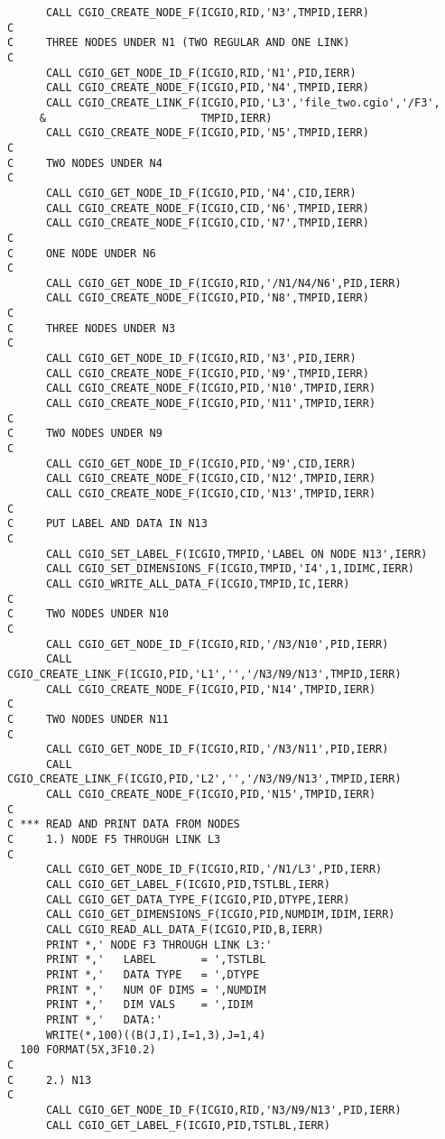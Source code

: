 \begin{verbatim}
      CALL CGIO_CREATE_NODE_F(ICGIO,RID,'N3',TMPID,IERR)
C
C     THREE NODES UNDER N1 (TWO REGULAR AND ONE LINK)
C
      CALL CGIO_GET_NODE_ID_F(ICGIO,RID,'N1',PID,IERR)
      CALL CGIO_CREATE_NODE_F(ICGIO,PID,'N4',TMPID,IERR)
      CALL CGIO_CREATE_LINK_F(ICGIO,PID,'L3','file_two.cgio','/F3',
     &                        TMPID,IERR)
      CALL CGIO_CREATE_NODE_F(ICGIO,PID,'N5',TMPID,IERR)
C
C     TWO NODES UNDER N4
C
      CALL CGIO_GET_NODE_ID_F(ICGIO,PID,'N4',CID,IERR)
      CALL CGIO_CREATE_NODE_F(ICGIO,CID,'N6',TMPID,IERR)
      CALL CGIO_CREATE_NODE_F(ICGIO,CID,'N7',TMPID,IERR)
C
C     ONE NODE UNDER N6
C
      CALL CGIO_GET_NODE_ID_F(ICGIO,RID,'/N1/N4/N6',PID,IERR)
      CALL CGIO_CREATE_NODE_F(ICGIO,PID,'N8',TMPID,IERR)
C
C     THREE NODES UNDER N3
C
      CALL CGIO_GET_NODE_ID_F(ICGIO,RID,'N3',PID,IERR)
      CALL CGIO_CREATE_NODE_F(ICGIO,PID,'N9',TMPID,IERR)
      CALL CGIO_CREATE_NODE_F(ICGIO,PID,'N10',TMPID,IERR)
      CALL CGIO_CREATE_NODE_F(ICGIO,PID,'N11',TMPID,IERR)
C
C     TWO NODES UNDER N9
C
      CALL CGIO_GET_NODE_ID_F(ICGIO,PID,'N9',CID,IERR)
      CALL CGIO_CREATE_NODE_F(ICGIO,CID,'N12',TMPID,IERR)
      CALL CGIO_CREATE_NODE_F(ICGIO,CID,'N13',TMPID,IERR)
C
C     PUT LABEL AND DATA IN N13
C
      CALL CGIO_SET_LABEL_F(ICGIO,TMPID,'LABEL ON NODE N13',IERR)
      CALL CGIO_SET_DIMENSIONS_F(ICGIO,TMPID,'I4',1,IDIMC,IERR)
      CALL CGIO_WRITE_ALL_DATA_F(ICGIO,TMPID,IC,IERR)
C
C     TWO NODES UNDER N10
C
      CALL CGIO_GET_NODE_ID_F(ICGIO,RID,'/N3/N10',PID,IERR)
      CALL CGIO_CREATE_LINK_F(ICGIO,PID,'L1','','/N3/N9/N13',TMPID,IERR)
      CALL CGIO_CREATE_NODE_F(ICGIO,PID,'N14',TMPID,IERR)
C
C     TWO NODES UNDER N11
C
      CALL CGIO_GET_NODE_ID_F(ICGIO,RID,'/N3/N11',PID,IERR)
      CALL CGIO_CREATE_LINK_F(ICGIO,PID,'L2','','/N3/N9/N13',TMPID,IERR)
      CALL CGIO_CREATE_NODE_F(ICGIO,PID,'N15',TMPID,IERR)
C
C *** READ AND PRINT DATA FROM NODES
C     1.) NODE F5 THROUGH LINK L3
C
      CALL CGIO_GET_NODE_ID_F(ICGIO,RID,'/N1/L3',PID,IERR)
      CALL CGIO_GET_LABEL_F(ICGIO,PID,TSTLBL,IERR)
      CALL CGIO_GET_DATA_TYPE_F(ICGIO,PID,DTYPE,IERR)
      CALL CGIO_GET_DIMENSIONS_F(ICGIO,PID,NUMDIM,IDIM,IERR)
      CALL CGIO_READ_ALL_DATA_F(ICGIO,PID,B,IERR)
      PRINT *,' NODE F3 THROUGH LINK L3:'
      PRINT *,'   LABEL       = ',TSTLBL
      PRINT *,'   DATA TYPE   = ',DTYPE
      PRINT *,'   NUM OF DIMS = ',NUMDIM
      PRINT *,'   DIM VALS    = ',IDIM
      PRINT *,'   DATA:'
      WRITE(*,100)((B(J,I),I=1,3),J=1,4)
  100 FORMAT(5X,3F10.2)
C
C     2.) N13
C
      CALL CGIO_GET_NODE_ID_F(ICGIO,RID,'N3/N9/N13',PID,IERR)
      CALL CGIO_GET_LABEL_F(ICGIO,PID,TSTLBL,IERR)

\end{verbatim}
